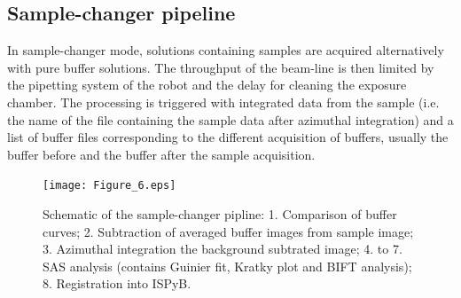 \documentclass[preprint]{iucr}              %
\begin{document}





\subsection{Sample-changer pipeline}
\label{sc-pipeline}
In sample-changer mode, solutions containing samples are acquired alternatively with pure buffer solutions.
The throughput of the beam-line is then limited by the pipetting system of the robot and the delay for cleaning the exposure chamber.  
The processing is triggered with integrated data from the sample (i.e. the name of the file containing the sample data after azimuthal integration) and a list of 
buffer files corresponding to the different acquisition of buffers, usually the buffer before and the buffer after the sample acquisition.

\begin{figure}
   \label{samplechanger_worflow}
   \texttt{[image: Figure\_6.eps]}
   \caption{Schematic of the sample-changer pipline: 
   1. Comparison of buffer curves;
   2. Subtraction of averaged buffer images from sample image;
   3. Azimuthal integration the background subtrated image;
   4. to 7. SAS analysis (contains Guinier fit, Kratky plot and BIFT analysis);
   8. Registration into ISPyB.}
\end{figure}
\end{document}
